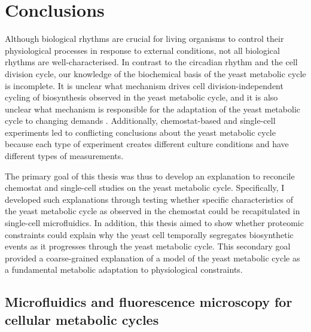 \chapter{Conclusions}
\label{ch:concl}

Although biological rhythms are crucial for living organisms to control their physiological processes in response to external conditions, not all biological rhythms are well-characterised.
In contrast to the circadian rhythm and the cell division cycle, our knowledge of the biochemical basis of the yeast metabolic cycle is incomplete.
It is unclear what mechanism drives cell division-independent cycling of biosynthesis observed in the yeast metabolic cycle, and it is also unclear what mechanism is responsible for the adaptation of the yeast metabolic cycle to changing demands \parencite{zylstraMetabolicDynamicsCell2022}.
Additionally, chemostat-based and single-cell experiments led to conflicting conclusions about the yeast metabolic cycle because each type of experiment creates different culture conditions and have different types of measurements.

The primary goal of this thesis was thus to develop an explanation to reconcile chemostat and single-cell studies on the yeast metabolic cycle.
Specifically, I developed such explanations through testing whether specific characteristics of the yeast metabolic cycle as observed in the chemostat could be recapitulated in single-cell microfluidics.
In addition, this thesis aimed to show whether proteomic constraints could explain why the yeast cell temporally segregates biosynthetic events as it progresses through the yeast metabolic cycle.
This secondary goal provided a coarse-grained explanation of a model of the yeast metabolic cycle as a fundamental metabolic adaptation to physiological constraints.


\section{Microfluidics and fluorescence microscopy for cellular metabolic cycles}
\label{sec:concl-biology}

